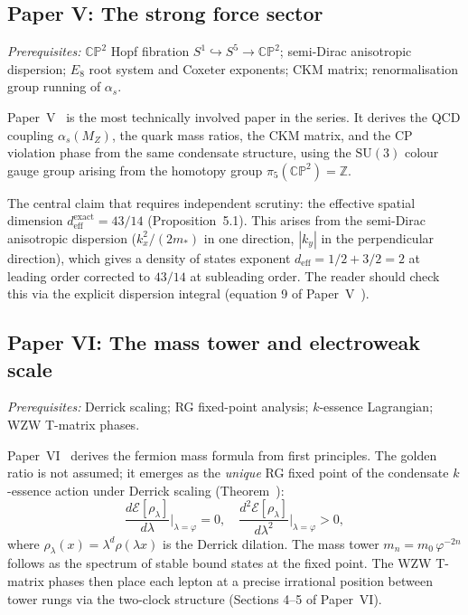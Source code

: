\documentclass[11pt,a4paper]{article}
\newcommand{\vp}{\varphi}
\newcommand{\ZZ}{\mathbb{Z}}
\begin{document}
\subsection{Paper V: The strong force sector}

\textit{Prerequisites:} $\mathbb{CP}^2$ Hopf fibration $S^1\hookrightarrow S^5\to\mathbb{CP}^2$;
semi-Dirac anisotropic dispersion; $E_8$ root system and Coxeter exponents;
CKM matrix; renormalisation group running of $\alpha_s$.

Paper~V~\cite{Paper5} is the most technically involved paper in the series. It derives the
QCD coupling $\alpha_s(M_Z)$, the quark mass ratios, the CKM matrix, and the CP
violation phase from the same condensate structure, using the $\mathrm{SU}(3)$
colour gauge group arising from the homotopy group $\pi_5(\mathbb{CP}^2)=\ZZ$.

The central claim that requires independent scrutiny: the effective spatial
dimension $d_{\mathrm{eff}}^{\mathrm{exact}} = 43/14$ (Proposition~5.1).
This arises from the semi-Dirac anisotropic dispersion ($k_x^2/(2m_*)$ in one
direction, $|k_y|$ in the perpendicular direction), which gives a density of
states exponent $d_{\mathrm{eff}} = 1/2 + 3/2 = 2$ at leading order corrected
to $43/14$ at subleading order. The reader should check this via the explicit
dispersion integral (equation 9 of Paper~V~\cite{Paper5}).

\subsection{Paper VI: The mass tower and electroweak scale}

\textit{Prerequisites:} Derrick scaling; RG fixed-point analysis;
$k$-essence Lagrangian; WZW T-matrix phases.

Paper~VI~\cite{Paper6} derives the fermion mass formula from first principles. The golden ratio
is not assumed; it emerges as the \emph{unique} RG fixed point of the condensate
$k$-essence action under Derrick scaling (Theorem~):
\begin{equation}
  \frac{d\mathcal{E}[\rho_\lambda]}{d\lambda}\bigg|_{\lambda=\vp} = 0,
  \quad
  \frac{d^2\mathcal{E}[\rho_\lambda]}{d\lambda^2}\bigg|_{\lambda=\vp} > 0,
\end{equation}
where $\rho_\lambda(x) = \lambda^d\rho(\lambda x)$ is the Derrick dilation.
The mass tower $m_n = m_0\,\vp^{-2n}$ follows as the spectrum of stable bound
states at the fixed point. The WZW T-matrix phases then place each lepton at a
precise irrational position between tower rungs via the two-clock structure
(Sections 4--5 of Paper~VI).
\end{document}
